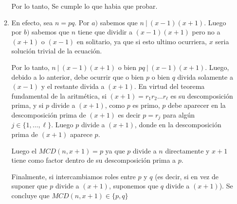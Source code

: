 \documentclass[letterpaper,11pt]{article}
\theoremstyle{plain}
\begin{document}
\begin{enumerate}
\begin{enumerate}
    Por lo tanto, Se cumple lo que habia que probar.
    
    \item En efecto, sea $n=pq$. Por $a)$ sabemos que $n~|~(x-1)(x+1)$. Luego por $b)$ sabemos que $n$ tiene que dividir a $(x-1)(x+1)$ pero no a $(x+1)$ o $(x-1)$ en solitario, ya que si esto ultimo ocurriera, $x$ seria solución trivial de la ecuación.
    
    Por lo tanto, $n~|~(x-1)(x+1)$ o bien $pq~|~(x-1)(x+1)$. Luego, debido a lo anterior, debe ocurrir que o bien $p$ o bien $q$ divida solamente a $(x-1)$ y el restante divida a $(x+1)$. En virtud del teorema fundamental de la aritmética, si $(x+1)=r_{1}r_{2}\dots r_{\ell}$ es su descomposición prima, y si $p$ divide a $(x+1)$, como $p$ es primo, $p$ debe aparecer en la descomposición prima de $(x+1)$ es decir $p=r_j$ para algún $j\in \{1, \dots, \ell\}$. Luego $p$ divide a $(x+1)$, donde en la descomposición prima de $(x+1)$ aparece $p$.
    
    Luego el $MCD(n,x+1)=p$ ya que $p$ divide a $n$ directamente y $x+1$ tiene como factor dentro de su descomposición prima a $p$.
    
    Finalmente, si intercambiamos roles entre $p$ y $q$ (es decir, si en vez de suponer que $p$ divide a $(x+1)$, suponemos que $q$ divide a $(x+1)$). Se concluye que $MCD(n,x+1)\in \{p,q\}$
\end{enumerate}
    
\end{enumerate}
\end{document}
